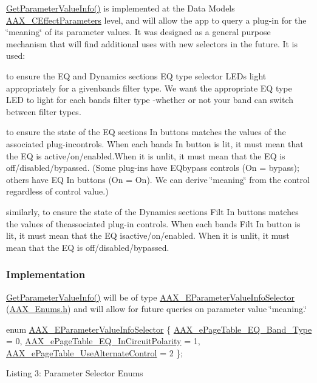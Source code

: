 \hyperlink{a00061_a1702de6d62b5b41b6a8b2f510300392b}{Get\+Parameter\+Value\+Info()} is implemented at the Data Model\textquotesingle{}s \hyperlink{a00018}{A\+A\+X\+\_\+\+C\+Effect\+Parameters} level, and will allow the app to query a plug-\/in for the \char`\"{}meaning\char`\"{} of its parameter values. It was designed as a general purpose mechanism that will find additional uses with new selectors in the future. It is used\+: 
\begin{DoxyItemize}
\item to ensure the E\+Q and Dynamics sections\textquotesingle{} E\+Q type selector L\+E\+Ds light appropriately for a givenband\textquotesingle{}s filter type. We want the appropriate E\+Q type L\+E\+D to light for each band\textquotesingle{}s filter type -\/whether or not your band can switch between filter types. 
\item to ensure the state of the E\+Q section\textquotesingle{}s In buttons matches the values of the associated plug-\/incontrols. When each band\textquotesingle{}s In button is lit, it must mean that the E\+Q is active/on/enabled.\+When it is unlit, it must mean that the E\+Q is off/disabled/bypassed. (Some plug-\/ins have E\+Qbypass controls (On = bypass); others have E\+Q In buttons (On = On). We can derive \char`\"{}meaning\char`\"{} from the control regardless of control value.) 
\item similarly, to ensure the state of the Dynamics section\textquotesingle{}s Filt In buttons matches the values of theassociated plug-\/in controls. When each band\textquotesingle{}s Filt In button is lit, it must mean that the E\+Q isactive/on/enabled. When it is unlit, it must mean that the E\+Q is off/disabled/bypassed. 
\end{DoxyItemize}

\hypertarget{a00363_subsection__implementation}{}\subsubsection{Implementation}\label{a00363_subsection__implementation}
\hyperlink{a00018_a8f0a38e7445a97282ea3a295979bbbea}{Get\+Parameter\+Value\+Info()} will be of type \hyperlink{a00206_aa169208a2ce713fa021e20deb2eaf608}{A\+A\+X\+\_\+\+E\+Parameter\+Value\+Info\+Selector} (\hyperlink{a00206}{A\+A\+X\+\_\+\+Enums.\+h}) and will allow for future queries on parameter value \char`\"{}meaning.\char`\"{}


\begin{DoxyCode}
\textcolor{keyword}{enum} \hyperlink{a00206_aa169208a2ce713fa021e20deb2eaf608}{AAX\_EParameterValueInfoSelector}
\{
    \hyperlink{a00206_aa169208a2ce713fa021e20deb2eaf608a99ca84cc3dae0f125082d36893a12bcd}{AAX\_ePageTable\_EQ\_Band\_Type} = 0,
    \hyperlink{a00206_aa169208a2ce713fa021e20deb2eaf608ac5a06a293b7706191d3371813c47e999}{AAX\_ePageTable\_EQ\_InCircuitPolarity} = 1,
    \hyperlink{a00206_aa169208a2ce713fa021e20deb2eaf608a1a0d975a333d3aee81b22f878697e9c4}{AAX\_ePageTable\_UseAlternateControl} = 2
\}; 
\end{DoxyCode}
  Listing 3\+: Parameter Selector Enums

